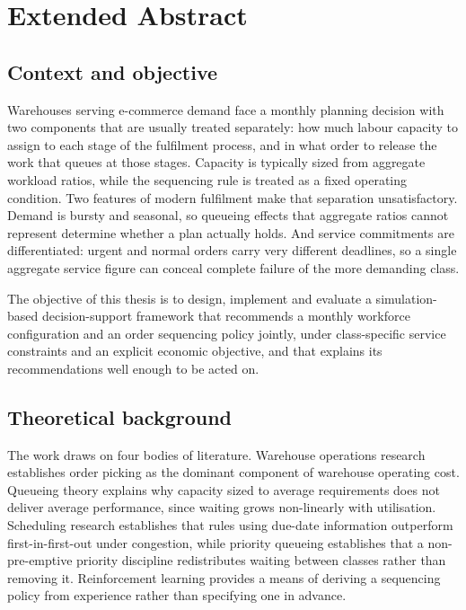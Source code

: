 \chapter*{Extended Abstract}

\section*{Context and objective}

Warehouses serving e-commerce demand face a monthly planning decision with two components that
are usually treated separately: how much labour capacity to assign to each stage of the
fulfilment process, and in what order to release the work that queues at those stages. Capacity
is typically sized from aggregate workload ratios, while the sequencing rule is treated as a
fixed operating condition. Two features of modern fulfilment make that separation
unsatisfactory. Demand is bursty and seasonal, so queueing effects that aggregate ratios cannot
represent determine whether a plan actually holds. And service commitments are differentiated:
urgent and normal orders carry very different deadlines, so a single aggregate service figure
can conceal complete failure of the more demanding class.

The objective of this thesis is to design, implement and evaluate a simulation-based
decision-support framework that recommends a monthly workforce configuration and an order
sequencing policy jointly, under class-specific service constraints and an explicit economic
objective, and that explains its recommendations well enough to be acted on.

\section*{Theoretical background}

The work draws on four bodies of literature. Warehouse operations research establishes order
picking as the dominant component of warehouse operating cost. Queueing theory explains why
capacity sized to average requirements does not deliver average performance, since waiting grows
non-linearly with utilisation. Scheduling research establishes that rules using due-date
information outperform first-in-first-out under congestion, while priority queueing establishes
that a non-pre-emptive priority discipline redistributes waiting between classes rather than
removing it. Reinforcement learning provides a means of deriving a sequencing policy from
experience rather than specifying one in advance.

